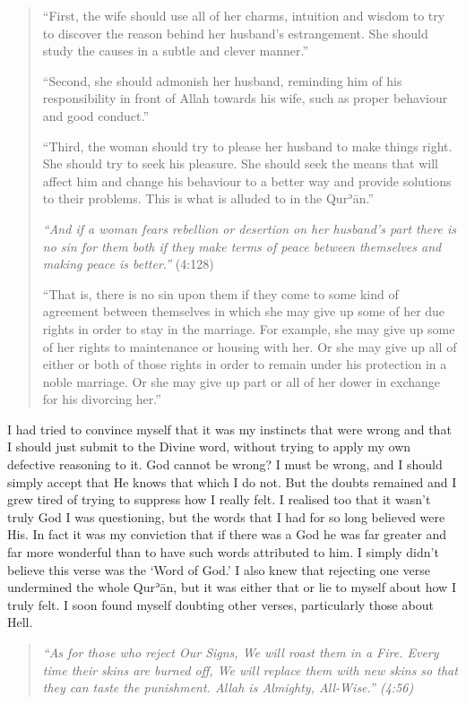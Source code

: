 \documentclass[12pt]{memoir}
\def\´{ʾ} %
\def \Quran{Qur\-\´ān} %
\newcommand{\QRef}[1]{{\color{darkblue}#1}}
\begin{document}
\begin{quote}
“First, the wife should use all of her charms,
intuition and wisdom to try to discover the reason
behind her husband’s estrangement.
She should study the causes in a subtle and clever manner.”

“Second, she should admonish her husband,
reminding him of his responsibility in front of Allah towards his wife,
such as proper behaviour and good conduct.”

“Third, the woman should try to please her husband to make things right.
She should try to seek his pleasure.
She should seek the means that will affect him
and change his behaviour to a better way
and provide solutions to their problems.
This is what is alluded to in the \Quran.”

\emph{“And if a woman fears rebellion or desertion on her husband’s part
there is no sin for them both if they make terms of peace between themselves
and making peace is better.”} (\QRef{4:128})

“That is, there is no sin upon them if they come to some kind of agreement
between themselves in which she may give up some of her due rights
in order to stay in the marriage.
For example, she may give up some of her rights
to maintenance or housing with her.
Or she may give up all of either or both of those rights
in order to remain under his protection in a noble marriage.
Or she may give up part or all of her dower
in exchange for his divorcing her.”
\end{quote}

I had tried to convince myself that it was my instincts
that were wrong and that I should just submit to the Divine word,
without trying to apply my own defective reasoning to it.
God cannot be wrong?
I must be wrong, and I should simply accept
that He knows that which I do not.
But the doubts remained and I grew tired of trying
to suppress how I really felt.
I realised too that it wasn’t truly God I was questioning,
but the words that I had for so long believed were His.
In fact it was my conviction that if there was a God
he was far greater and far more wonderful
than to have such words attributed to him.
I simply didn’t believe this verse was the ‘Word of God.’
I also knew that rejecting one verse undermined the whole \Quran,
but it was either that or lie to myself about how I truly felt.
I soon found myself doubting other verses, particularly those about Hell.

\begin{quote}
\itshape
“As for those who reject Our Signs, We will roast them in a Fire.
Every time their skins are burned off,
We will replace them with new skins so that they can taste the punishment.
Allah is Almighty, All-Wise.” (\QRef{4:56})
\end{quote}
\end{document}
